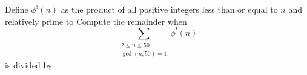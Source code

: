 Define $\phi^!(n)$ as the product of all positive integers less than or equal to $n$ and relatively prime to  Compute the remainder when \[ \sum_{\substack{2 \le n \le 50 \\ \gcd(n,50)=1}} \phi^!(n) \]is divided by 